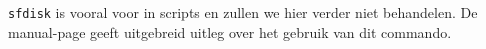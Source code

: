 \texttt{sfdisk} is vooral voor in scripts en zullen we hier verder niet behandelen. De manual-page geeft uitgebreid uitleg over het gebruik van dit commando.

